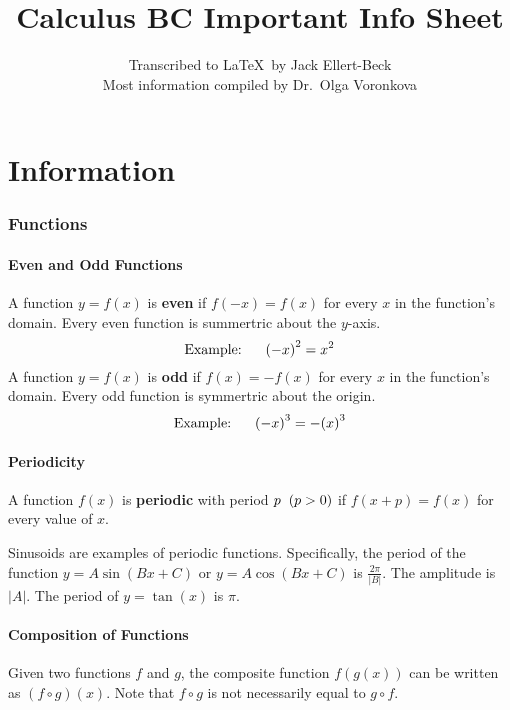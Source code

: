 \documentclass{artikel3}
\begin{document}
\title{Calculus BC Important Info Sheet}
\author{Transcribed to \LaTeX\ by Jack Ellert-Beck\\ 
Most information compiled by Dr.\ Olga Voronkova}
\maketitle

\newpage

\tableofcontents

\newpage

\part{Information}

\section{Functions}

\subsection{Even and Odd Functions}
A function $y=f(x)$ is \textbf{even} if $f(-x)=f(x)$ for every $x$ 
in the function's domain. Every even function is summertric about 
the $y$-axis. 
\[\text{Example:}\hspace{6 mm} {(-x)}^2=x^2 \]
A function $y=f(x)$ is \textbf{odd} if $f(x)=-f(x)$ for every $x$ 
in the function's domain. Every odd function is symmertric about 
the origin. 
\[\text{Example:}\hspace{6 mm} {(-x)}^3=-{(x)}^3 \]

\subsection{Periodicity}
A function $f(x)$ is \textbf{periodic} with period $p\hspace{2 mm}(p>0)$ if 
$f(x+p)=f(x)$ for every value of $x$.

Sinusoids are examples of periodic functions. Specifically, the period
of the function $y=A\sin(Bx+C)$ or $y=A\cos(Bx+C)$ is $\frac{2\pi}{|B|}$.
The amplitude is $|A|$. The period of $y=\tan(x)$ is $\pi$.

\subsection{Composition of Functions}
Given two functions $f$ and $g$, the composite function
$f(g(x))$ can be written as $(f\circ g)(x)$. Note that 
$f\circ g$ is not necessarily equal to $g\circ f$.
\end{document}
